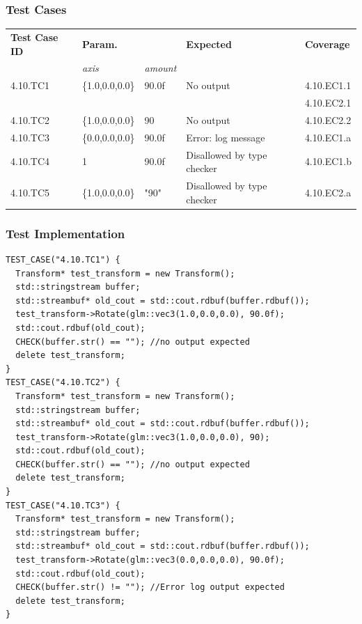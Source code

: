 \documentclass[11pt]{article}
\begin{document}
\subsubsection*{Test Cases}
\label{sec:orgd3b7cce}
\begin{center}
\begin{tabularx}{\textwidth}{lXXXX}
\hline
\textbf{Test Case ID} & \textbf{Param.} &  & \textbf{Expected} & \textbf{Coverage}\\
 & \textit{axis} & \textit{amount} &  & \\
\hline
4.10.TC1 & \{1.0,0.0,0.0\} & 90.0f & No output & 4.10.EC1.1\\
 &  &  &  & 4.10.EC2.1\\
\hline
4.10.TC2 & \{1.0,0.0,0.0\} & 90 & No output & 4.10.EC2.2\\
\hline
4.10.TC3 & \{0.0,0.0,0.0\} & 90.0f & Error: log message & 4.10.EC1.a\\
\hline
4.10.TC4 & 1 & 90.0f & Disallowed by type checker & 4.10.EC1.b\\
\hline
4.10.TC5 & \{1.0,0.0,0.0\} & "90" & Disallowed by type checker & 4.10.EC2.a\\
\hline
\end{tabularx}
\end{center}
\subsubsection*{Test Implementation}
\label{sec:org26a0fc6}

\begin{verbatim}
TEST_CASE("4.10.TC1") {
  Transform* test_transform = new Transform();
  std::stringstream buffer;
  std::streambuf* old_cout = std::cout.rdbuf(buffer.rdbuf());
  test_transform->Rotate(glm::vec3(1.0,0.0,0.0), 90.0f);
  std::cout.rdbuf(old_cout);
  CHECK(buffer.str() == ""); //no output expected
  delete test_transform;
}
TEST_CASE("4.10.TC2") {
  Transform* test_transform = new Transform();
  std::stringstream buffer;
  std::streambuf* old_cout = std::cout.rdbuf(buffer.rdbuf());
  test_transform->Rotate(glm::vec3(1.0,0.0,0.0), 90);
  std::cout.rdbuf(old_cout);
  CHECK(buffer.str() == ""); //no output expected
  delete test_transform;
}
TEST_CASE("4.10.TC3") {
  Transform* test_transform = new Transform();
  std::stringstream buffer;
  std::streambuf* old_cout = std::cout.rdbuf(buffer.rdbuf());
  test_transform->Rotate(glm::vec3(0.0,0.0,0.0), 90.0f);
  std::cout.rdbuf(old_cout);
  CHECK(buffer.str() != ""); //Error log output expected
  delete test_transform;
}
\end{verbatim}
\end{document}
